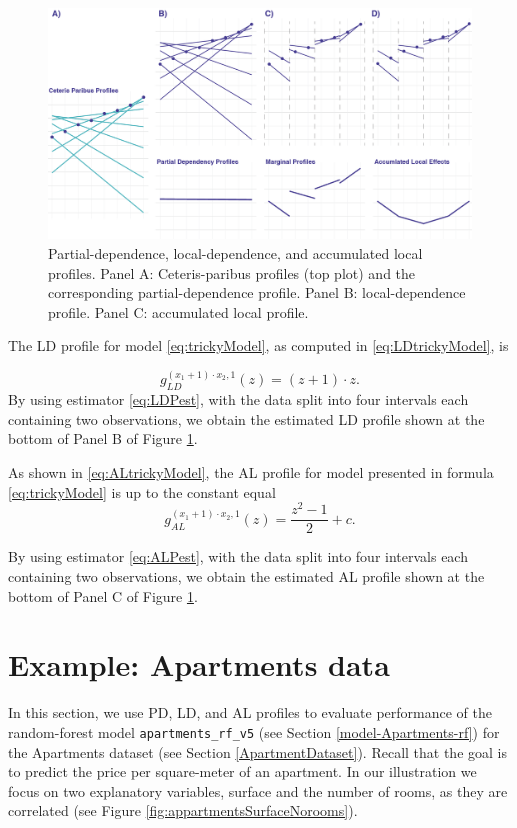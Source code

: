 \documentclass[]{krantz}
\begin{document}
\begin{figure}

{\centering \includegraphics[width=0.9\linewidth]{figure/CP_ALL} 

}

\caption{Partial-dependence, local-dependence, and accumulated local profiles. Panel A: Ceteris-paribus profiles (top plot) and the corresponding partial-dependence profile. Panel B: local-dependence profile. Panel C: accumulated local profile.}\label{fig:accumulatedLocalEffects}
\end{figure}

The LD profile for model \eqref{eq:trickyModel}, as computed in \eqref{eq:LDtrickyModel}, is

\[
g_{LD}^{(x_1+1)\cdot x_2,1}(z) =  (z+1)\cdot z.
\]
By using estimator \eqref{eq:LDPest}, with the data split into four intervals each containing two observations, we obtain the estimated LD profile shown at the bottom of Panel B of Figure \ref{fig:accumulatedLocalEffects}.

As shown in \eqref{eq:ALtrickyModel}, the AL profile for model presented in formula \eqref{eq:trickyModel} is up to the constant equal
\[
g_{AL}^{(x_1+1)\cdot x_2,1}(z) =  \frac{z^2-1}{2} + c.
\]

By using estimator \eqref{eq:ALPest}, with the data split into four intervals each containing two observations, we obtain the estimated AL profile shown at the bottom of Panel C of Figure \ref{fig:accumulatedLocalEffects}.

\hypertarget{CDPExample}{%
\section{Example: Apartments data}\label{CDPExample}}

In this section, we use PD, LD, and AL profiles to evaluate performance of the random-forest model \texttt{apartments\_rf\_v5} (see Section \ref{model-Apartments-rf}) for the Apartments dataset (see Section \ref{ApartmentDataset}). Recall that the goal is to predict the price per square-meter of an apartment. In our illustration we focus on two explanatory variables, surface and the number of rooms, as they are correlated (see Figure \ref{fig:appartmentsSurfaceNorooms}).
\end{document}
